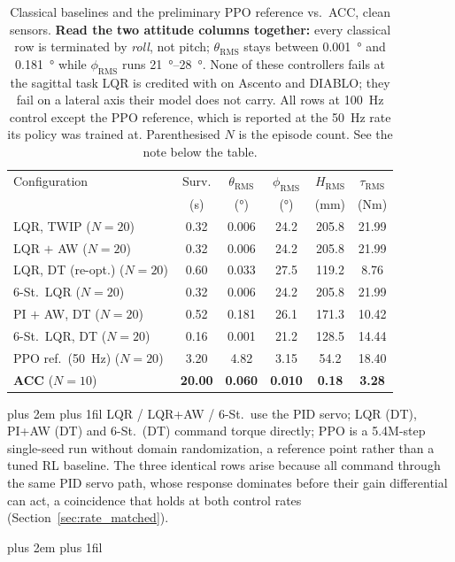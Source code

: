 \documentclass[a4paper,fleqn]{cas-dc}
\newcommand{\tabnote}{\par\leftskip=0pt\rightskip=0pt plus 2em%
  \parfillskip=0pt plus 1fil\relax}
\begin{document}
\begin{table}[pos=!tbp]
\centering
\footnotesize
\caption{Classical baselines and the preliminary PPO reference vs.\ ACC, clean sensors. \textbf{Read the two attitude columns together:} every classical row is terminated by \emph{roll}, not pitch; $\theta_{\text{RMS}}$ stays between \SI{0.001}{\degree} and \SI{0.181}{\degree} while $\phi_{\text{RMS}}$ runs \SIrange{21}{28}{\degree}. None of these controllers fails at the sagittal task LQR is credited with on Ascento and DIABLO; they fail on a lateral axis their model does not carry. All rows at \SI{100}{Hz} control except the PPO reference, which is reported at the \SI{50}{Hz} rate its policy was trained at. Parenthesised $N$ is the episode count. See the note below the table.}
\label{tab:lqr_baselines}
\setlength{\tabcolsep}{4pt}
\begin{tabular}{@{}l S[table-format=2.2] S[table-format=1.3] S[table-format=2.2] S[table-format=3.1] S[table-format=2.2]@{}}
\toprule
Configuration & {Surv.} & {$\theta_{\text{RMS}}$} & {$\phi_{\text{RMS}}$} & {$H_{\text{RMS}}$} & {$\tau_{\text{RMS}}$} \\
& {(s)} & {(\si{\degree})} & {(\si{\degree})} & {(mm)} & {(Nm)} \\
\midrule
LQR, TWIP ($N{=}20$)         & 0.32 & 0.006 & 24.2 & 205.8 & 21.99 \\
LQR $+$ AW ($N{=}20$)        & 0.32 & 0.006 & 24.2 & 205.8 & 21.99 \\
LQR, DT (re-opt.) ($N{=}20$) & 0.60 & 0.033 & 27.5 & 119.2 & 8.76 \\
6-St.\ LQR ($N{=}20$)        & 0.32 & 0.006 & 24.2 & 205.8 & 21.99 \\
PI $+$ AW, DT ($N{=}20$)     & 0.52 & 0.181 & 26.1 & 171.3 & 10.42 \\
6-St.\ LQR, DT ($N{=}20$)    & 0.16 & 0.001 & 21.2 & 128.5 & 14.44 \\
PPO ref.\ (\SI{50}{Hz}) ($N{=}20$)& 3.20 & 4.82  & 3.15 & 54.2  & 18.40 \\
\addlinespace
\textbf{ACC} ($N{=}10$)      & \bfseries 20.00 & \bfseries 0.060 & \bfseries 0.010 & \bfseries 0.18 & \bfseries 3.28 \\
\bottomrule
\end{tabular}
\vspace{3pt}\tabnote\noindent\footnotesize
LQR / LQR+AW / 6-St.\ use the PID servo; LQR (DT), PI+AW (DT) and 6-St.\ (DT) command torque directly; PPO is a 5.4M-step single-seed run without domain randomization, a reference point rather than a tuned RL baseline. The three identical rows arise because all command through the same PID servo path, whose response dominates before their gain differential can act, a coincidence that holds at both control rates (Section~\ref{sec:rate_matched}).\tabnote\noindent

\end{table}
\end{document}
